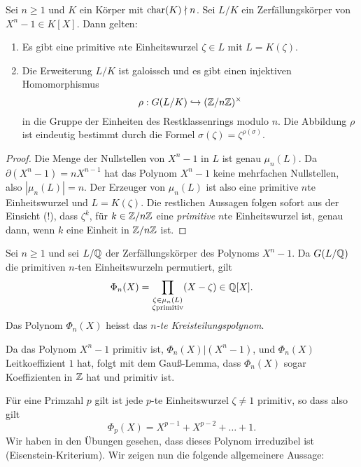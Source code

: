 \documentclass{book}
\begin{document}
\begin{prop}
    \label{prop:galoisew}
    Sei $n \ge 1$ und $K$ ein Körper mit $\operatorname{char}(K) \nmid n$. Sei $L/K$ ein Zerfällungskörper von $X^n -1 \in K[X]$. Dann gelten:
    \begin{enumerate}
        \item Es gibt eine primitive $n$te Einheitswurzel $\zeta \in L$ mit $L = K(\zeta)$. 
        \item Die Erweiterung $L/K$ ist galoissch und es gibt einen injektiven Homomorphismus
            \[
                \rho: G(L/K) \hookrightarrow (\mathbb{Z}/n\mathbb{Z})^{\times}
            \]
            in die Gruppe der Einheiten des Restklassenrings modulo $n$. Die
            Abbildung $\rho$ ist eindeutig bestimmt durch die Formel
            $\sigma(\zeta) = \zeta^{\rho(\sigma)}$. 
    \end{enumerate}
\end{prop}
\begin{proof}
    Die Menge der Nullstellen von $X^n-1$ in $L$ ist genau $\mu_n(L)$. Da
    $\partial(X^n - 1) = nX^{n-1}$ hat das Polynom $X^n - 1$ keine mehrfachen
    Nullstellen, also $|\mu_n(L)| = n$. Der Erzeuger von $\mu_n(L)$ ist also
    eine primitive $n$te Einheitswurzel und $L = K(\zeta)$. Die restlichen
    Aussagen folgen sofort aus der Einsicht (!), dass $\zeta^k$, für $k \in
    \mathbb{Z}/n\mathbb{Z}$ eine {\em primitive} $n$te Einheitswurzel ist, genau dann, wenn
    $k$ eine Einheit in $\mathbb{Z}/n\mathbb{Z}$ ist. 
\end{proof}

Sei $n \ge 1$ und sei $L/\mathbb{Q}$ der Zerfällungskörper des Polynoms $X^n -1$. Da $G(L/\mathbb{Q})$ die
primitiven $n$-ten Einheitswurzeln permutiert, gilt
\[
	\Phi_n(X) = \prod_{\substack{\zeta \in \mu_n(L) \\ \zeta \text{primitiv}}} (X- \zeta) \in
	\mathbb{Q}[X].
\]
Das Polynom $\Phi_n(X)$ heisst das {\em $n$-te Kreisteilungspolynom}. 

\begin{rem} Da das Polynom $X^n -1$ primitiv ist, $\Phi_n(X)|(X^n-1)$, und $\Phi_n(X)$ Leitkoeffizient
	$1$ hat, folgt mit dem Gauß-Lemma, dass $\Phi_n(X)$ sogar Koeffizienten in $\mathbb{Z}$ hat und
	primitiv ist. 
\end{rem}

Für eine Primzahl $p$ gilt ist jede $p$-te Einheitswurzel $\zeta \ne 1$ primitiv, so dass also gilt
\[
	\Phi_p(X) = X^{p-1} + X^{p-2} + \dots + 1.
\]
Wir haben in den Übungen gesehen, dass dieses Polynom irreduzibel ist (Eisenstein-Kriterium). Wir
zeigen nun die folgende allgemeinere Aussage: 
\end{document}
